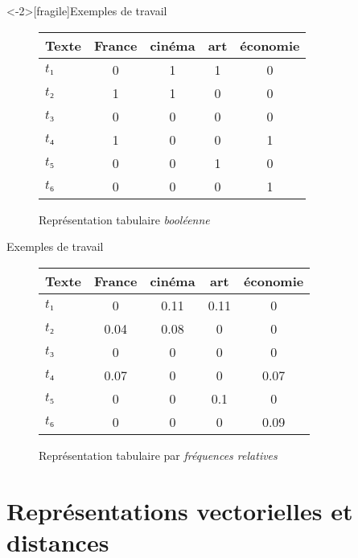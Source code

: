 \documentclass[../allslides.tex]{subfiles}
\begin{document}
\begin{frame}<-2>[fragile]{Exemples de travail}
	\begin{figure}
		\caption{Représentation tabulaire \emph{booléenne}}
		\begin{tabular}{l*{4}{S}}
			\toprule
			\textbf{Texte} & {\textbf{France}} & {\textbf{cinéma}} & {\textbf{art}} & {\textbf{économie}}\\
			\midrule
			\(t₁\) & 0 & 1 & 1 & 0\\
			\(t₂\) & 1 & 1 & 0 & 0\\
			\(t₃\) & 0 & 0 & 0 & 0\\
			\(t₄\) & 1 & 0 & 0 & 1\\
			\(t₅\) & 0 & 0 & 1 & 0\\
			\(t₆\) & 0 & 0 & 0 & 1\\
			\bottomrule
		\end{tabular}
	\end{figure}
\end{frame}

\begin{frame}{Exemples de travail}
	\begin{figure}
		\caption{Représentation tabulaire par \emph{fréquences relatives}}
		\begin{tabular}{l*{4}{S}}
			\toprule
			\textbf{Texte} & {\textbf{France}} & {\textbf{cinéma}} & {\textbf{art}} & {\textbf{économie}}\\
			\midrule
			\(t₁\) & 0 & 0.11 & 0.11 & 0\\
			\(t₂\) & 0.04 & 0.08 & 0 & 0\\
			\(t₃\) & 0 & 0 & 0 & 0\\
			\(t₄\) & 0.07 & 0 & 0 & 0.07\\
			\(t₅\) & 0 & 0 & 0.1 & 0\\
			\(t₆\) & 0 & 0 & 0 & 0.09\\
			\bottomrule
		\end{tabular}
	\end{figure}
\end{frame}


\section{Représentations vectorielles et distances}
\end{document}
